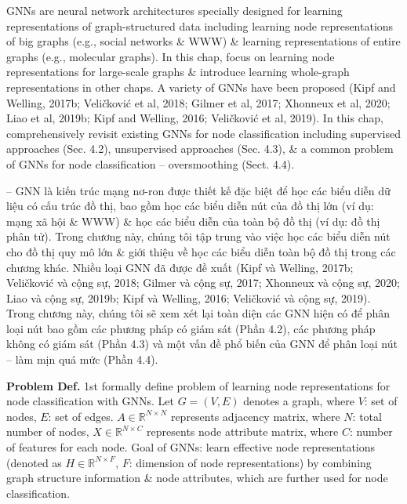 \documentclass{article}
\begin{document}
\begin{itemize}
\begin{itemize}
        GNNs are neural network architectures specially designed for learning representations of graph-structured data including learning node representations of big graphs (e.g., social networks \& WWW) \& learning representations of entire graphs (e.g., molecular graphs). In this chap, focus on learning node representations for large-scale graphs \& introduce learning whole-graph representations in other chaps. A variety of GNNs have been proposed (Kipf and Welling, 2017b; Veličković et al, 2018; Gilmer et al, 2017; Xhonneux et al, 2020; Liao et al, 2019b; Kipf and Welling, 2016; Veličković et al, 2019). In this chap, comprehensively revisit existing GNNs for node classification including supervised approaches (Sec. 4.2), unsupervised approaches (Sec. 4.3), \& a common problem of GNNs for node classification -- oversmoothing (Sect. 4.4).

        -- GNN là kiến trúc mạng nơ-ron được thiết kế đặc biệt để học các biểu diễn dữ liệu có cấu trúc đồ thị, bao gồm học các biểu diễn nút của đồ thị lớn (ví dụ: mạng xã hội \& WWW) \& học các biểu diễn của toàn bộ đồ thị (ví dụ: đồ thị phân tử). Trong chương này, chúng tôi tập trung vào việc học các biểu diễn nút cho đồ thị quy mô lớn \& giới thiệu về học các biểu diễn toàn bộ đồ thị trong các chương khác. Nhiều loại GNN đã được đề xuất (Kipf và Welling, 2017b; Veličković và cộng sự, 2018; Gilmer và cộng sự, 2017; Xhonneux và cộng sự, 2020; Liao và cộng sự, 2019b; Kipf và Welling, 2016; Veličković và cộng sự, 2019). Trong chương này, chúng tôi sẽ xem xét lại toàn diện các GNN hiện có để phân loại nút bao gồm các phương pháp có giám sát (Phần 4.2), các phương pháp không có giám sát (Phần 4.3) và một vấn đề phổ biến của GNN để phân loại nút -- làm mịn quá mức (Phần 4.4).

        {\bf Problem Def.} 1st formally define problem of learning node representations for node classification with GNNs. Let $G = (V,E)$ denotes a graph, where $V$: set of nodes, $E$: set of edges. $A\in\mathbb{R}^{N\times N}$ represents adjacency matrix, where $N$: total number of nodes, $X\in\mathbb{R}^{N\times C}$ represents node attribute matrix, where $C$: number of features for each node. Goal of GNNs: learn effective node representations (denoted as $H\in\mathbb{R}^{N\times F}$, $F$: dimension of node representations) by combining graph structure information \& node attributes, which are further used for node classification.


\end{itemize}
\end{itemize}
\end{document}
